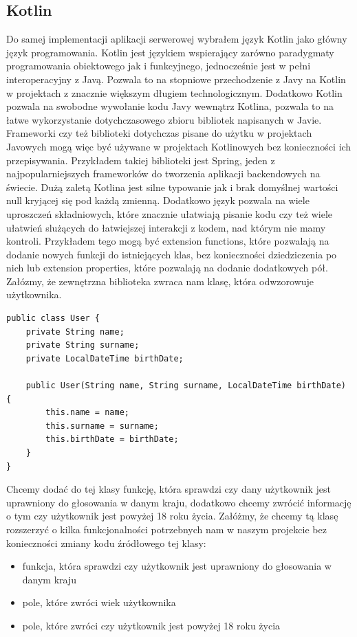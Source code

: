 \subsection{Kotlin}\label{subsec:uzyte-technologie-kotlin}
Do samej implementacji aplikacji serwerowej wybrałem język Kotlin jako główny język programowania.
Kotlin jest językiem wspierający zarówno paradygmaty programowania obiektowego jak i funkcyjnego, jednocześnie jest w pełni interoperacyjny z Javą.
Pozwala to na stopniowe przechodzenie z Javy na Kotlin w projektach z znacznie większym długiem technologicznym.
Dodatkowo Kotlin pozwala na swobodne wywołanie kodu Javy wewnątrz Kotlina, pozwala to na łatwe wykorzystanie dotychczasowego zbioru bibliotek napisanych w Javie.
Frameworki czy też biblioteki dotychczas pisane do użytku w projektach Javowych mogą więc być używane w projektach Kotlinowych bez konieczności ich przepisywania.
Przykładem takiej biblioteki jest Spring, jeden z najpopularniejszych frameworków do tworzenia aplikacji backendowych na świecie.
Dużą zaletą Kotlina jest silne typowanie jak i brak domyślnej wartości null kryjącej się pod każdą zmienną.
Dodatkowo język pozwala na wiele uproszczeń składniowych, które znacznie ułatwiają pisanie kodu czy też wiele ułatwień slużących do łatwiejszej interakcji z kodem, nad którym nie mamy kontroli.
Przykładem tego mogą być extension functions, które pozwalają na dodanie nowych funkcji do istniejących klas, bez konieczności dziedziczenia po nich lub extension properties, które pozwalają na dodanie dodatkowych pół.
Załózmy, że zewnętrzna biblioteka zwraca nam klasę, która odwzorowuje użytkownika.
\begin{lstlisting}[caption=Przykład klasy User w Javie]
public class User {
    private String name;
    private String surname;
    private LocalDateTime birthDate;

    public User(String name, String surname, LocalDateTime birthDate) {
        this.name = name;
        this.surname = surname;
        this.birthDate = birthDate;
    }
}
\end{lstlisting}
Chcemy dodać do tej klasy funkcję, która sprawdzi czy dany użytkownik jest uprawniony do głosowania w danym kraju, dodatkowo chcemy zwrócić informację o tym czy użytkownik jest powyżej 18 roku życia.
Załóżmy, że chcemy tą klasę rozszerzyć o kilka funkcjonalności potrzebnych nam w naszym projekcie bez konieczności zmiany kodu źródłowego tej klasy:
\begin{itemize}
    \item funkcja, która sprawdzi czy użytkownik jest uprawniony do głosowania w danym kraju
    \item pole, które zwróci wiek użytkownika
    \item pole, które zwróci czy użytkownik jest powyżej 18 roku życia
\end{itemize}

